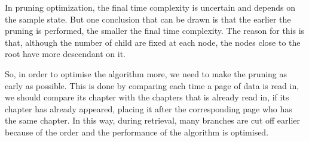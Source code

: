\documentclass[20pt]{ctexart}
\begin{document}
In pruning optimization, the final time complexity is uncertain and depends on the sample state. But one conclusion that can be drawn is that the earlier the pruning is performed, the smaller the final time complexity. 
The reason for this is that, although the number of child are fixed at each node, the nodes close to the root have more descendant on it.

So, in order to optimise the algorithm more, we need to make the pruning as early as possible. This is done by comparing each time a page of data is read in, we should compare its chapter with the chapters  that is already read in, 
if its chapter has already appeared, placing it after the corresponding page who has the same chapter.
In this way, during retrieval, many branches are cut off earlier because of the order and the performance of the algorithm is optimised.
\end{document}
